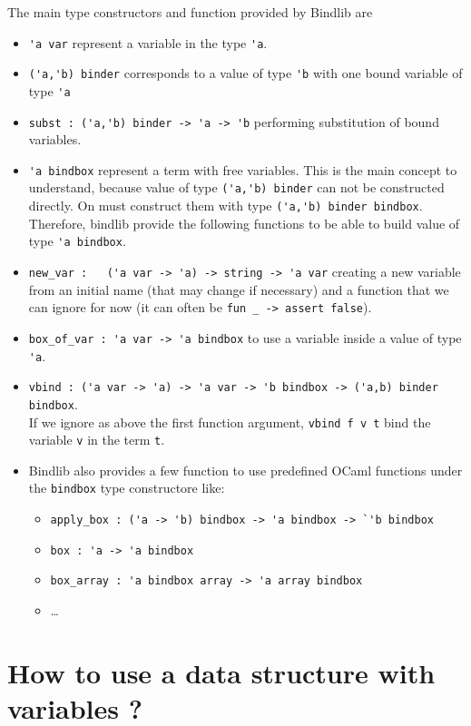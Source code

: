 \documentclass[11pt]{article}
\begin{document}
The main type constructors and function provided by Bindlib are
\begin{itemize}
\item \verb#'a var# represent a variable in the type \verb#'a#.
\item \verb#('a,'b) binder# corresponds to a value of type \verb#'b# with one bound variable of type
  \verb#'a#
\item \verb#subst : ('a,'b) binder -> 'a -> 'b# performing
  substitution of bound variables.
\item \verb#'a bindbox# represent a term with free variables. This is
  the main concept to understand, because value of type
  \verb#('a,'b) binder# can not be constructed directly. On must
  construct them with type \verb#('a,'b) binder bindbox#. Therefore,
  bindlib provide the following functions to be able to build value of
  type \verb#'a bindbox#.

\item \verb#new_var :   ('a var -> 'a) -> string -> 'a var#
  creating a new variable from an initial name (that may change if
  necessary) and a function that we can ignore for now
    (it can often be \verb#fun _ -> assert false#).

\item \verb#box_of_var : 'a var -> 'a bindbox# to use a variable
  inside a value of type \verb#'a#.

\item
  \verb#vbind : ('a var -> 'a) -> 'a var -> 'b bindbox -> ('a,b) binder bindbox#.\\
  If we ignore as above the first function argument, \verb#vbind f v t# bind the
  variable \verb#v# in the term \verb#t#.

\item Bindlib also provides a few function to use predefined OCaml
  functions under the \verb#bindbox# type constructore like:
  \begin{itemize}
  \item
    \verb#apply_box : ('a -> 'b) bindbox -> 'a bindbox -> `'b bindbox#
  \item \verb#box : 'a -> 'a bindbox#
  \item \verb#box_array : 'a bindbox array -> 'a array bindbox#
  \item …
  \end{itemize}
\end{itemize}

\section{How to use a data structure with variables ?}
\end{document}
